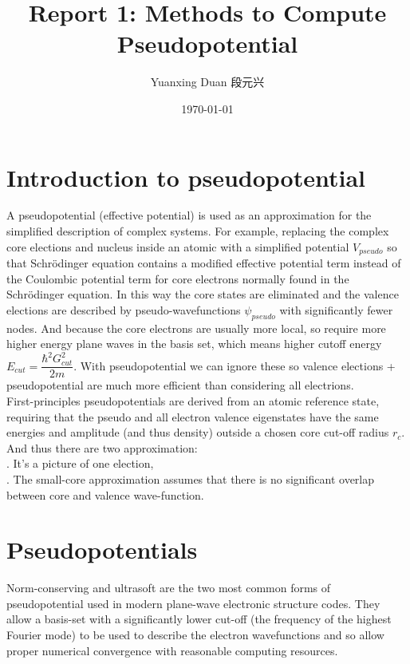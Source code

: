 \documentclass[UTF8]{ctexart}
\title{Report 1: Methods to Compute Pseudopotential}
\author{Yuanxing Duan 段元兴}
\date{\today}
\begin{document}
\maketitle
\thispagestyle{empty}
\setcounter{page}{1}
\newpage
\tableofcontents
\newpage
    \section{Introduction to pseudopotential}
        \indent A pseudopotential (effective potential) is used as an approximation for the
        simplified description of complex systems. For example, replacing the complex core elections
        and nucleus inside an atomic with a simplified potential $V_{pseudo}$ so that Schrödinger
        equation contains a modified effective potential term instead of the Coulombic potential
        term for core electrons normally found in the Schrödinger equation. In this way the core
        states are eliminated and the valence elections are described by pseudo-wavefunctions $\psi_{pseudo}$
        with significantly fewer nodes. And because the core electrons are usually more local, so require more
        higher energy plane waves in the basis set, which means higher cutoff energy $E_{cut}=\dfrac{\hbar^2G_{cut}^2}{2m}$.
        With pseudopotential we can ignore these so valence elections + pseudopotential are much more efficient than
        considering all electrions.\\
        First-principles pseudopotentials are derived from an atomic reference state, requiring that the pseudo and all
        electron valence eigenstates have the same energies and amplitude (and thus density) outside a chosen core cut-off
        radius $r_c$. And thus there are two approximation:\\
        . It's a picture of one election,\\
        . The small-core approximation assumes that there is no significant overlap between core and valence wave-function.\\
    \section{Pseudopotentials}
        \indent Norm-conserving and ultrasoft are the two most common forms of pseudopotential used in modern plane-wave electronic
        structure codes. They allow a basis-set with a significantly lower cut-off (the frequency of the highest Fourier mode) to be
        used to describe the electron wavefunctions and so allow proper numerical convergence with reasonable computing resources.
\end{document}

